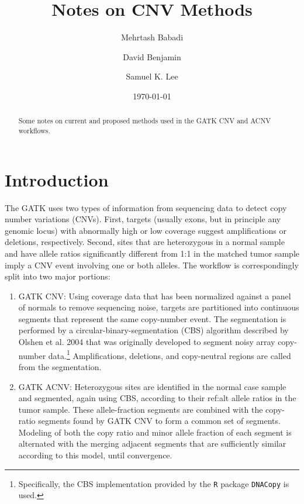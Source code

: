 \documentclass[nofootinbib,amssymb,amsmath]{revtex4}
\begin{document}
\title{Notes on CNV Methods}

\author{Mehrtash Babadi}

\author{David Benjamin}

\author{Samuel K. Lee}

\date{\today}

\begin{abstract}
Some notes on current and proposed methods used in the GATK CNV and ACNV workflows.
\end{abstract}

\maketitle

\section{Introduction}\label{introduction}

The GATK uses two types of information from sequencing data to detect copy number variations (CNVs).  First, targets (usually exons, but in principle any genomic locus) with abnormally high or low coverage suggest amplifications or deletions, respectively.  Second, sites that are heterozygous in a normal sample and have allele ratios significantly different from 1:1 in the matched tumor sample imply a CNV event involving one or both alleles.  The workflow is correspondingly split into two major portions:

\begin{enumerate}

\item GATK CNV:  Using coverage data that has been normalized against a panel of normals to remove sequencing noise, targets are partitioned into continuous segments that represent the same copy-number event.  The segmentation is performed by a circular-binary-segmentation (CBS) algorithm described by Olshen et al. 2004 that was originally developed to segment noisy array copy-number data.\footnote{Specifically, the CBS implementation provided by the \texttt{R} package \texttt{DNACopy} is used.}  Amplifications, deletions, and copy-neutral regions are called from the segmentation.

\item GATK ACNV:  Heterozygous sites are identified in the normal case sample and segmented, again using CBS, according to their ref:alt allele ratios in the tumor sample.  These allele-fraction segments are combined with the copy-ratio segments found by GATK CNV to form a common set of segments.  Modeling of both the copy ratio and minor allele fraction of each segment is alternated with the merging adjacent segments that are sufficiently similar according to this model, until convergence.

\end{enumerate}
\end{document}
